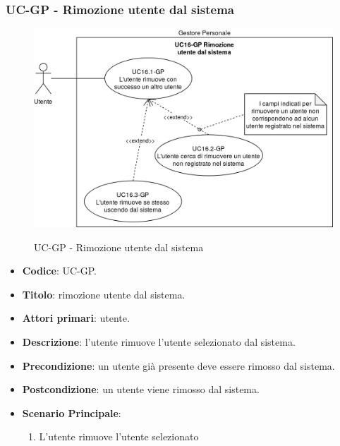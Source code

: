 \subsubsection{UC\theuccount-GP - Rimozione utente dal sistema}
		\begin{figure}[H]
			\centering
				\includegraphics[width=\columnwidth]{img/casi_d'uso/UC16.png}\\
			\caption{UC\theuccount-GP - Rimozione utente dal sistema}
		\end{figure}
	\begin{itemize}
		\item \textbf{Codice}: UC\theuccount-GP.
		\item \textbf{Titolo}: rimozione utente dal sistema.
		\item \textbf{Attori primari}: utente.
		\item \textbf{Descrizione}: l'utente rimuove l'utente selezionato dal sistema.
		\item \textbf{Precondizione}: un utente già presente deve essere rimosso dal sistema.
		\item \textbf{Postcondizione}: un utente viene rimosso dal sistema.
		\item \textbf{Scenario Principale}:
		\begin{enumerate}
			\item L'utente rimuove l'utente selezionato
		\end{enumerate}
\end{itemize}
	
